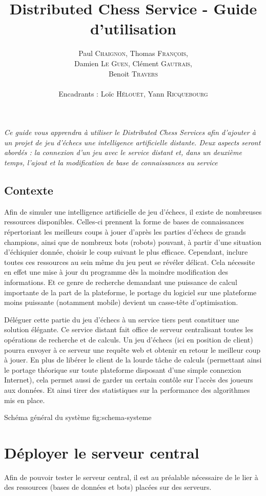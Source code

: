 \documentclass[a4paper,11pt]{article}
\title{ \textbf{Distributed Chess Service - Guide d'utilisation} }
\author{Paul \textsc{Chaignon}, Thomas \textsc{François}, \\
        Damien \textsc{Le Guen}, Clément \textsc{Gautrais}, \\
				Benoit \textsc{Travers} \\
        \\
        Encadrants : Loïc \textsc{Hélouët}, Yann \textsc{Ricquebourg}}
\date{}                    %
\begin{document}
\maketitle{}

{\em Ce guide vous apprendra à utiliser le Distributed Chess Services afin d'ajouter à un projet de jeu d'échecs une intelligence artificielle distante. Deux aspects seront abordés : la connexion d'un jeu avec le service distant et, dans un deuxième temps, l'ajout et la modification de base de connaissances au service}


\subsection*{Contexte}
        Afin de simuler une intelligence artificielle de jeu d'échecs, il existe de nombreuses ressources disponibles. Celles-ci prennent la forme de bases de connaissances répertoriant les meilleurs coups à jouer d'après les parties d'échecs de grands champions, ainsi que de nombreux bots (robots) pouvant, à partir d'une situation d'échiquier donnée, choisir le coup suivant le plus efficace. Cependant, inclure toutes ces ressources au sein même du jeu peut se révéler délicat. Cela nécessite en effet une mise à jour du programme dès la moindre modification des informations. Et ce genre de recherche demandant une puissance de calcul importante de la part de la plateforme, le portage du logiciel sur une plateforme moins puissante (notamment mobile) devient un casse-tête d'optimisation.
        
        Déléguer cette partie du jeu d'échecs à un service tiers peut constituer une solution élégante. Ce service distant fait office de serveur centralisant toutes les opérations de recherche et de calculs. Un jeu d'échecs (ici en position de client) pourra envoyer à ce serveur une requête web et obtenir en retour le meilleur coup à jouer. En plus de libérer le client de la lourde tâche de calculs (permettant ainsi le portage théorique sur toute plateforme disposant d'une simple connexion Internet), cela permet aussi de garder un certain contôle sur l'accès des joueurs aux données. Et ainsi tirer des statistiques sur la performance des algorithmes mis en place.

{Schéma général du système}
{fig:schema-systeme}


\section{Déployer le serveur central}
		Afin de pouvoir tester le serveur central, il est au préalable nécessaire de le lier à des ressources (bases de données et bots) placées sur des serveurs.
\end{document}
